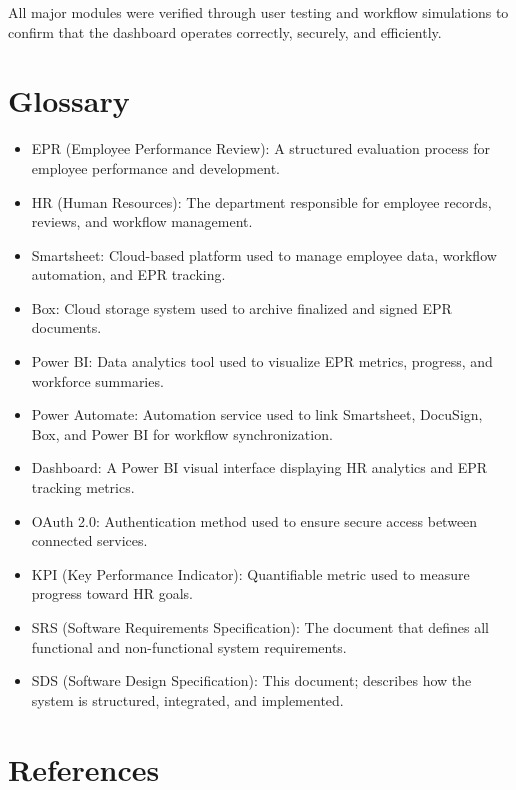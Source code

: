 \documentclass[12pt]{article}
\def\textbf#1{#1}%
\begin{document}
\noindent
All major modules were verified through user testing and workflow simulations to confirm that the dashboard operates correctly, securely, and efficiently.

\section{Glossary}

\begin{itemize}[nosep]
  \item \textbf{EPR (Employee Performance Review):} A structured evaluation process for employee performance and development.  
  \item \textbf{HR (Human Resources):} The department responsible for employee records, reviews, and workflow management.  
  \item \textbf{Smartsheet:} Cloud-based platform used to manage employee data, workflow automation, and EPR tracking.  
  \item \textbf{Box:} Cloud storage system used to archive finalized and signed EPR documents.  
  \item \textbf{Power BI:} Data analytics tool used to visualize EPR metrics, progress, and workforce summaries.  
  \item \textbf{Power Automate:} Automation service used to link Smartsheet, DocuSign, Box, and Power BI for workflow synchronization.  
  \item \textbf{Dashboard:} A Power BI visual interface displaying HR analytics and EPR tracking metrics.  
  \item \textbf{OAuth 2.0:} Authentication method used to ensure secure access between connected services.  
  \item \textbf{KPI (Key Performance Indicator):} Quantifiable metric used to measure progress toward HR goals.  
  \item \textbf{SRS (Software Requirements Specification):} The document that defines all functional and non-functional system requirements.  
  \item \textbf{SDS (Software Design Specification):} This document; describes how the system is structured, integrated, and implemented.  
\end{itemize}

\section{References}
\end{document}
